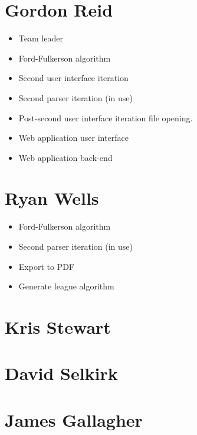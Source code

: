 \section{Gordon Reid}

\begin{itemize}
\item Team leader
\item Ford-Fulkerson algorithm
\item Second user interface iteration
\item Second parser iteration (in use)
\item Post-second user interface iteration file opening.
\item Web application user interface
\item Web application back-end
\end{itemize}

\section{Ryan Wells}

\begin{itemize}
\item Ford-Fulkerson algorithm
\item Second parser iteration (in use)
\item Export to PDF
\item Generate league algorithm
\end{itemize}

\section{Kris Stewart}

\section{David Selkirk}

\section{James Gallagher}
